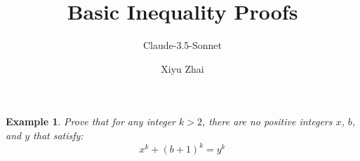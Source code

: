 \documentclass{article}
\newtheorem{example}{Example}
\begin{document}
\title{Basic Inequality Proofs}
\author{Claude-3.5-Sonnet \and Xiyu Zhai}
\maketitle

\begin{example}
    Prove that for any integer $k > 2$, there are no positive integers $x$, $b$, and $y$ that satisfy:
    $$x^k + (b+1)^k = y^k$$
\end{example}
\end{document}
